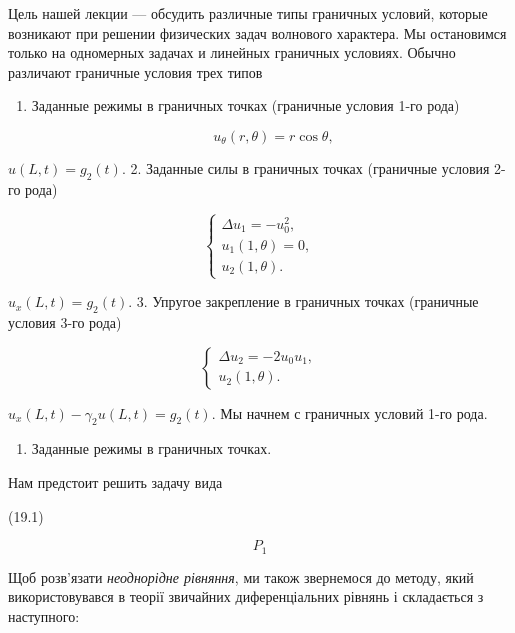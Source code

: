 \documentclass[
  ukrainian,
]{article}
\providecommand{\tightlist}{%
  \setlength{\itemsep}{0pt}\setlength{\parskip}{0pt}}
\begin{document}
Цель нашей лекции --- обсудить различные типы граничных условий, которые
возникают при решении физических задач волнового характера. Мы
остановимся только на одномерных задачах и линейных граничных условиях.
Обычно различают граничные условия трех типов

\begin{enumerate}
\def\labelenumi{\arabic{enumi}.}
\tightlist
\item
  Заданные режимы в граничных точках (граничные условия 1-го рода)
\end{enumerate}

\[
\qquad u_{\theta}(r, \theta) = r \cos \theta,
\]

\(u(L, t) = g_2(t).\) 2. Заданные силы в граничных точках (граничные
условия 2-го рода)

\[
\begin{cases} \Delta u_{1} = -u_{0}^{2}, \\ u_{1}(1, \theta) = 0, \\ u_{2}(1, \theta). \end{cases}
\]

\(u_x(L, t) = g_2(t).\) 3. Упругое закрепление в граничных точках
(граничные условия 3-го рода)

\[
\begin{cases} \Delta u_{2} = -2u_{0}u_{1}, \\ u_{2}(1, \theta). \end{cases}
\]

\(u_x(L, t) - \gamma_2 u(L, t) = g_2(t).\) Мы начнем с граничных условий
1-го рода.

\begin{enumerate}
\def\labelenumi{\arabic{enumi}.}
\tightlist
\item
  Заданные режимы в граничных точках.
\end{enumerate}

Нам предстоит решить задачу вида

(19.1)

\[
P_{1}
\]

Щоб розв'язати \emph{неоднорідне рівняння}, ми також звернемося до
методу, який використовувався в теорії звичайних диференціальних рівнянь
і складається з наступного:
\end{document}
